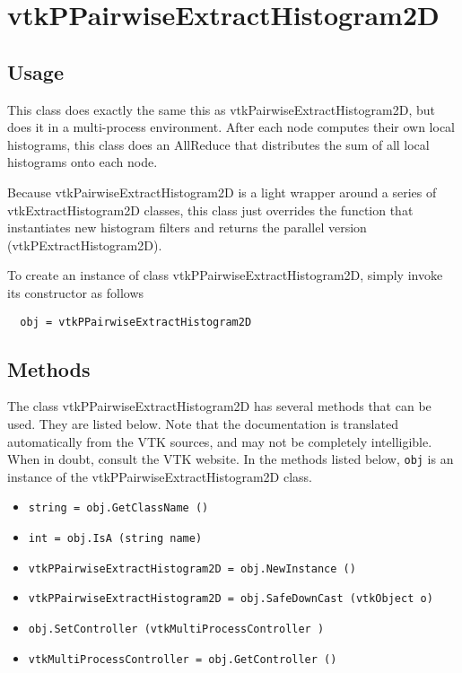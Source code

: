 \section{vtkPPairwiseExtractHistogram2D}

\subsection{Usage}

  This class does exactly the same this as vtkPairwiseExtractHistogram2D,
  but does it in a multi-process environment.  After each node
  computes their own local histograms, this class does an AllReduce
  that distributes the sum of all local histograms onto each node.

  Because vtkPairwiseExtractHistogram2D is a light wrapper around a series
  of vtkExtractHistogram2D classes, this class just overrides the function
  that instantiates new histogram filters and returns the parallel version
  (vtkPExtractHistogram2D).


To create an instance of class vtkPPairwiseExtractHistogram2D, simply
invoke its constructor as follows
\begin{verbatim}
  obj = vtkPPairwiseExtractHistogram2D
\end{verbatim}
\subsection{Methods}

The class vtkPPairwiseExtractHistogram2D has several methods that can be used.
  They are listed below.
Note that the documentation is translated automatically from the VTK sources,
and may not be completely intelligible.  When in doubt, consult the VTK website.
In the methods listed below, \verb|obj| is an instance of the vtkPPairwiseExtractHistogram2D class.
\begin{itemize}
\item  \verb|string = obj.GetClassName ()|

\item  \verb|int = obj.IsA (string name)|

\item  \verb|vtkPPairwiseExtractHistogram2D = obj.NewInstance ()|

\item  \verb|vtkPPairwiseExtractHistogram2D = obj.SafeDownCast (vtkObject o)|

\item  \verb|obj.SetController (vtkMultiProcessController )|

\item  \verb|vtkMultiProcessController = obj.GetController ()|

\end{itemize}
